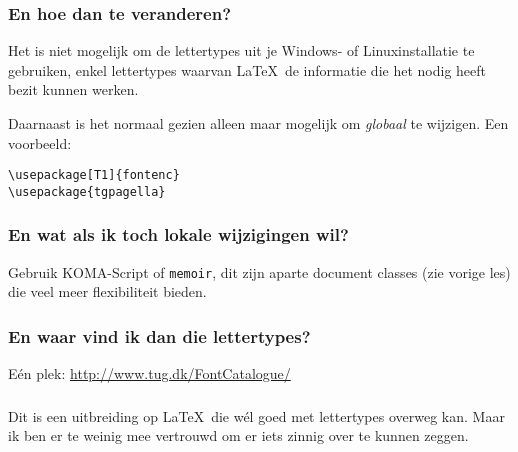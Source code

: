 \begin{frame}[fragile]
  \frametitle{En hoe dan te veranderen?}

  Het is niet mogelijk om de lettertypes uit je Windows- of Linuxinstallatie te gebruiken, enkel lettertypes waarvan \LaTeX~de informatie die het nodig heeft bezit kunnen werken.

  Daarnaast is het normaal gezien alleen maar mogelijk om \emph{globaal} te wijzigen. Een voorbeeld:
\begin{verbatim}
\usepackage[T1]{fontenc}
\usepackage{tgpagella}
\end{verbatim}
\end{frame}

\begin{frame}[fragile]
  \frametitle{En wat als ik toch lokale wijzigingen wil?}

  Gebruik KOMA-Script of \texttt{memoir}, dit zijn aparte document classes (zie vorige les) die veel meer flexibiliteit bieden.
\end{frame}

\begin{frame}
  \frametitle{En waar vind ik dan die lettertypes?}

  E\'en plek: \url{http://www.tug.dk/FontCatalogue/}
\end{frame}

\begin{frame}[fragile]
  \frametitle{\XeTeX}

  Dit is een uitbreiding op \LaTeX~die w\'el goed met lettertypes overweg kan. Maar ik ben er te weinig mee vertrouwd om er iets zinnig over te kunnen zeggen.
\end{frame}
